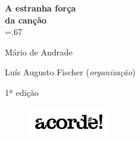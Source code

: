 




\begingroup\thispagestyle{empty}\vspace*{.05\textheight}\parindent=0pt 
              \formular
              \huge 
              \textbf{A estranha força\\da canção}\\\baselineskip=.67\baselineskip 

              \medskip
              
              \LARGE
              Mário de Andrade
              
              \vspace{4cm}              

              \newfontfamily{}
              {\selectfont\minion\small Luís Augusto Fischer (\textit{organização})}
              
              

              {\selectfont\minion\footnotesize
              1ª edição}
                    
              \vfill
              
              \begin{figure}
              \vspace*{-1.22\baselineskip}
              \includegraphics[width=3.5cm]{./logoacorde.png}
              \end{figure}

